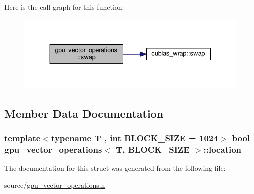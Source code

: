 Here is the call graph for this function\-:\nopagebreak
\begin{figure}[H]
\begin{center}
\leavevmode
\includegraphics[width=334pt]{structgpu__vector__operations_a29768a8d4f6da7a9d3d4a49d4517bb23_cgraph}
\end{center}
\end{figure}




\subsection{Member Data Documentation}
\hypertarget{structgpu__vector__operations_abff92b3240864d39244e5cdfe43ec048}{
\subsubsection[{location}]{\setlength{\rightskip}{0pt plus 5cm}template$<$typename T , int B\-L\-O\-C\-K\-\_\-\-S\-I\-Z\-E = 1024$>$ bool {\bf gpu\-\_\-vector\-\_\-operations}$<$ T, B\-L\-O\-C\-K\-\_\-\-S\-I\-Z\-E $>$\-::location}}\label{structgpu__vector__operations_abff92b3240864d39244e5cdfe43ec048}


The documentation for this struct was generated from the following file\-:\begin{DoxyCompactItemize}
\item 
source/\hyperlink{gpu__vector__operations_8h}{gpu\-\_\-vector\-\_\-operations.\-h}\end{DoxyCompactItemize}
